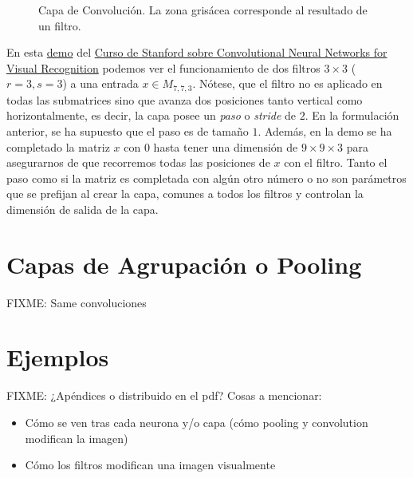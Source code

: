 \begin{itemize}
\begin{figure}

\caption{Capa de Convolución. La zona grisácea corresponde al resultado de un filtro. }
\label{fig:convolution}
\end{figure}

En esta \href{https://cs231n.github.io/assets/conv-demo/index.html}{demo} del \href{http://cs231n.stanford.edu/}{Curso de Stanford sobre Convolutional Neural Networks for Visual Recognition} podemos ver el funcionamiento de dos filtros $3\times 3$ ($r=3,s=3$) a una entrada $x\in M_{7,7,3}$. Nótese, que el filtro no es aplicado en todas las submatrices sino que avanza dos posiciones tanto vertical como horizontalmente, es decir, la capa posee un \emph{paso} o \emph{stride} de $2$. En la formulación anterior, se ha supuesto que el paso es de tamaño $1$. Además, en la demo se ha completado la matriz $x$ con $0$ hasta tener una dimensión de $9\times 9\times 3$ para asegurarnos de que recorremos todas las posiciones de $x$ con el filtro. Tanto el paso como si la matriz es completada con algún otro número o no son parámetros que se prefijan al crear la capa, comunes a todos los filtros y controlan la dimensión de salida de la capa.


\section{Capas de Agrupación o Pooling}

FIXME: Same convoluciones

\section{Ejemplos}

FIXME: ¿Apéndices o distribuido en el pdf? Cosas a mencionar:

\begin{itemize}
\item Cómo se ven tras cada neurona y/o capa (cómo pooling y convolution modifican la imagen)
\item Cómo los filtros modifican una imagen visualmente
\end{itemize}


\end{itemize}

